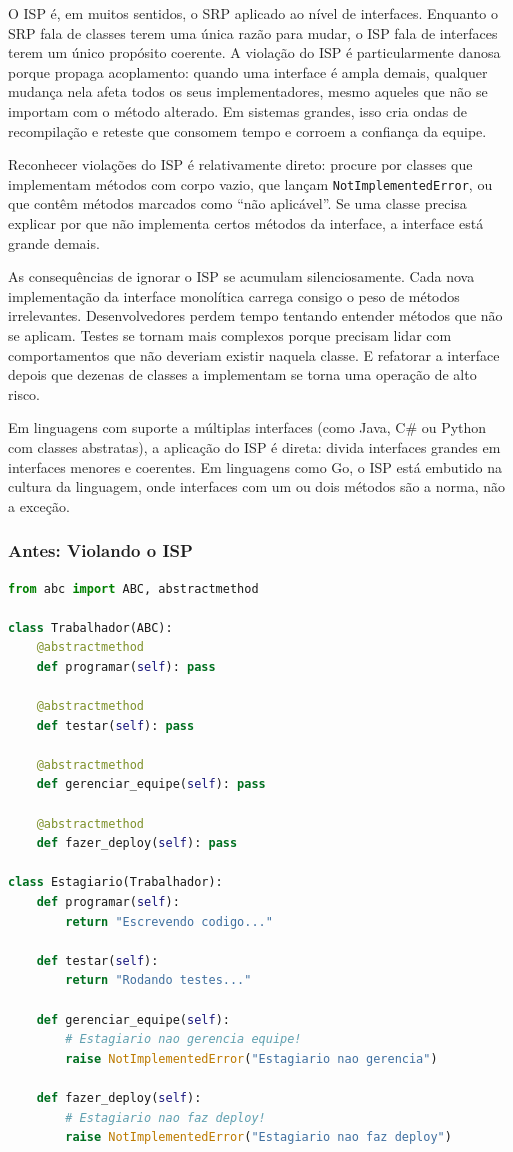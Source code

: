 O ISP é, em muitos sentidos, o SRP aplicado ao nível de interfaces. Enquanto o
SRP fala de classes terem uma única razão para mudar, o ISP fala de interfaces
terem um único propósito coerente. A violação do ISP é particularmente danosa
porque propaga acoplamento: quando uma interface é ampla demais, qualquer mudança
nela afeta todos os seus implementadores, mesmo aqueles que não se importam com
o método alterado. Em sistemas grandes, isso cria ondas de recompilação e
reteste que consomem tempo e corroem a confiança da equipe.

Reconhecer violações do ISP é relativamente direto: procure por classes que
implementam métodos com corpo vazio, que lançam \texttt{NotImplementedError},
ou que contêm métodos marcados como ``não aplicável''. Se uma classe precisa
explicar por que não implementa certos métodos da interface, a interface está
grande demais.

As consequências de ignorar o ISP se acumulam silenciosamente. Cada nova
implementação da interface monolítica carrega consigo o peso de métodos
irrelevantes. Desenvolvedores perdem tempo tentando entender métodos que não
se aplicam. Testes se tornam mais complexos porque precisam lidar com
comportamentos que não deveriam existir naquela classe. E refatorar a
interface depois que dezenas de classes a implementam se torna uma
operação de alto risco.

Em linguagens com suporte a múltiplas interfaces (como Java, C\# ou Python
com classes abstratas), a aplicação do ISP é direta: divida interfaces
grandes em interfaces menores e coerentes. Em linguagens como Go, o ISP
está embutido na cultura da linguagem, onde interfaces com um ou dois
métodos são a norma, não a exceção.

\subsubsection{Antes: Violando o ISP}

\begin{lstlisting}[language=Python, caption={Violação do ISP: interface monolítica}]
from abc import ABC, abstractmethod

class Trabalhador(ABC):
    @abstractmethod
    def programar(self): pass

    @abstractmethod
    def testar(self): pass

    @abstractmethod
    def gerenciar_equipe(self): pass

    @abstractmethod
    def fazer_deploy(self): pass

class Estagiario(Trabalhador):
    def programar(self):
        return "Escrevendo codigo..."

    def testar(self):
        return "Rodando testes..."

    def gerenciar_equipe(self):
        # Estagiario nao gerencia equipe!
        raise NotImplementedError("Estagiario nao gerencia")

    def fazer_deploy(self):
        # Estagiario nao faz deploy!
        raise NotImplementedError("Estagiario nao faz deploy")
\end{lstlisting}

